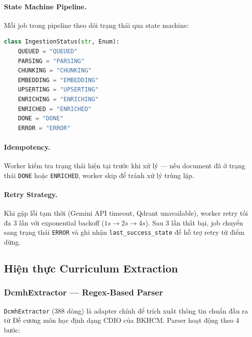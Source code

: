 \paragraph{State Machine Pipeline.}

Mỗi job trong pipeline theo dõi trạng thái qua state machine:

\begin{lstlisting}[language=Python, caption={State machine trong document-worker}]
class IngestionStatus(str, Enum):
    QUEUED = "QUEUED"
    PARSING = "PARSING"
    CHUNKING = "CHUNKING"
    EMBEDDING = "EMBEDDING"
    UPSERTING = "UPSERTING"
    ENRICHING = "ENRICHING"
    ENRICHED = "ENRICHED"
    DONE = "DONE"
    ERROR = "ERROR"
\end{lstlisting}

\paragraph{Idempotency.}

Worker kiểm tra trạng thái hiện tại trước khi xử lý --- nếu document
đã ở trạng thái \texttt{DONE} hoặc \texttt{ENRICHED}, worker skip
để tránh xử lý trùng lặp.

\paragraph{Retry Strategy.}

Khi gặp lỗi tạm thời (Gemini API timeout, Qdrant unavailable),
worker retry tối đa 3 lần với exponential backoff
($1s \to 2s \to 4s$). Sau 3 lần thất bại, job chuyển sang trạng
thái \texttt{ERROR} và ghi nhận \texttt{last\_success\_state}
để hỗ trợ retry từ điểm dừng.

\subsection{Hiện thực Curriculum Extraction}

\subsubsection{DcmhExtractor --- Regex-Based Parser}

\texttt{DcmhExtractor} (388 dòng) là adapter chính để trích xuất
thông tin chuẩn đầu ra từ Đề cương môn học định dạng CDIO của
BKHCM. Parser hoạt động theo 4 bước:

